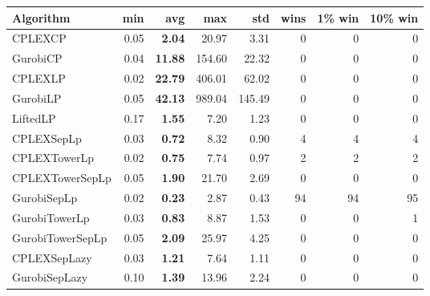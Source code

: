 \begin{tabular}{lrrrrrrr}
Algorithm & min & avg & max & std
& wins & 1\% win & 10\% win 
\\
\hline
CPLEXCP&0.05& \bf2.04& 20.97& 3.31&0&0&0\\
GurobiCP&0.04& \bf11.88& 154.60& 22.32&0&0&0\\
CPLEXLP&0.02& \bf22.79& 406.01& 62.02&0&0&0\\
GurobiLP&0.05& \bf42.13& 989.04& 145.49&0&0&0\\
LiftedLP&0.17& \bf1.55& 7.20& 1.23&0&0&0\\
CPLEXSepLp&0.03& \bf0.72& 8.32& 0.90&4&4&4\\
CPLEXTowerLp&0.02& \bf0.75& 7.74& 0.97&2&2&2\\
CPLEXTowerSepLp&0.05& \bf1.90& 21.70& 2.69&0&0&0\\
GurobiSepLp&0.02& \bf0.23& 2.87& 0.43&94&94&95\\
GurobiTowerLp&0.03& \bf0.83& 8.87& 1.53&0&0&1\\
GurobiTowerSepLp&0.05& \bf2.09& 25.97& 4.25&0&0&0\\
CPLEXSepLazy&0.03& \bf1.21& 7.64& 1.11&0&0&0\\
GurobiSepLazy&0.10& \bf1.39& 13.96& 2.24&0&0&0
\end{tabular}
